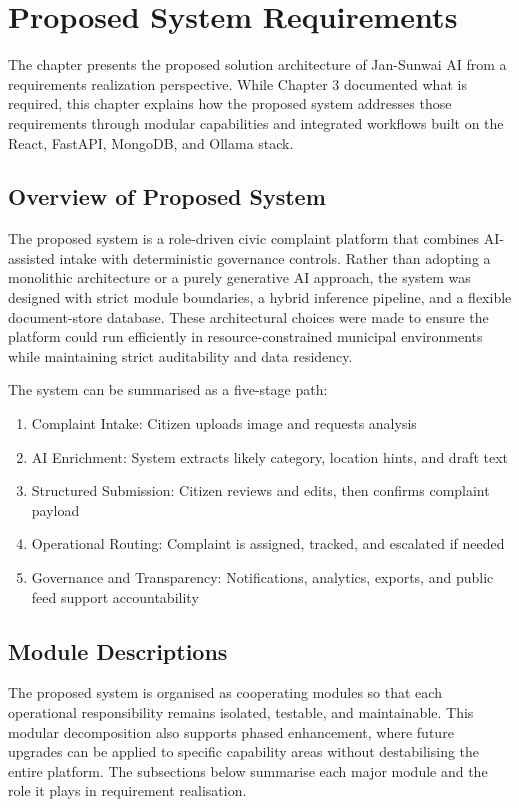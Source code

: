 \chapter{Proposed System Requirements}

The chapter presents the proposed solution architecture of Jan-Sunwai AI from a requirements realization perspective. While Chapter 3 documented what is required, this chapter explains how the proposed system addresses those requirements through modular capabilities and integrated workflows built on the React, FastAPI, MongoDB, and Ollama stack.

\section{Overview of Proposed System}

The proposed system is a role-driven civic complaint platform that combines AI-assisted intake with deterministic governance controls. Rather than adopting a monolithic architecture or a purely generative AI approach, the system was designed with strict module boundaries, a hybrid inference pipeline, and a flexible document-store database. These architectural choices were made to ensure the platform could run efficiently in resource-constrained municipal environments while maintaining strict auditability and data residency.

The system can be summarised as a five-stage path:

\begin{enumerate}
\item Complaint Intake: Citizen uploads image and requests analysis
\item AI Enrichment: System extracts likely category, location hints, and draft text
\item Structured Submission: Citizen reviews and edits, then confirms complaint payload
\item Operational Routing: Complaint is assigned, tracked, and escalated if needed
\item Governance and Transparency: Notifications, analytics, exports, and public feed support accountability
\end{enumerate}

\section{Module Descriptions}

The proposed system is organised as cooperating modules so that each operational responsibility remains isolated, testable, and maintainable. This modular decomposition also supports phased enhancement, where future upgrades can be applied to specific capability areas without destabilising the entire platform. The subsections below summarise each major module and the role it plays in requirement realisation.

